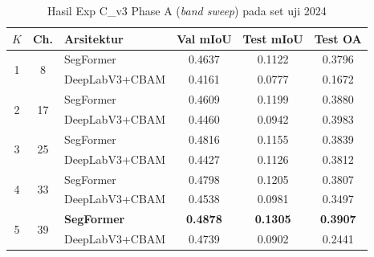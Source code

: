 \begin{table}[H]
    \centering
    \caption{Hasil Exp C\_v3 Phase A (\textit{band sweep}) pada set uji 2024}
    \label{tab:cv3_band_results}
    \begin{tabular}{|c|c|l|c|c|c|}
    \hline
    $K$ & \textbf{Ch.} & \textbf{Arsitektur} & \textbf{Val mIoU} & \textbf{Test mIoU} & \textbf{Test OA} \\
    \hline
    \multirow{2}{*}{1} & \multirow{2}{*}{8}  & SegFormer      & 0.4637 & 0.1122 & 0.3796 \\
                       &                     & DeepLabV3+CBAM & 0.4161 & 0.0777 & 0.1672 \\
    \hline
    \multirow{2}{*}{2} & \multirow{2}{*}{17} & SegFormer      & 0.4609 & 0.1199 & 0.3880 \\
                       &                     & DeepLabV3+CBAM & 0.4460 & 0.0942 & 0.3983 \\
    \hline
    \multirow{2}{*}{3} & \multirow{2}{*}{25} & SegFormer      & 0.4816 & 0.1155 & 0.3839 \\
                       &                     & DeepLabV3+CBAM & 0.4427 & 0.1126 & 0.3812 \\
    \hline
    \multirow{2}{*}{4} & \multirow{2}{*}{33} & SegFormer      & 0.4798 & 0.1205 & 0.3807 \\
                       &                     & DeepLabV3+CBAM & 0.4538 & 0.0981 & 0.3497 \\
    \hline
    \multirow{2}{*}{5} & \multirow{2}{*}{39} & \textbf{SegFormer}      & \textbf{0.4878} & \textbf{0.1305} & \textbf{0.3907} \\
                       &                     & DeepLabV3+CBAM & 0.4739 & 0.0902 & 0.2441 \\
    \hline
    \end{tabular}
\end{table}

